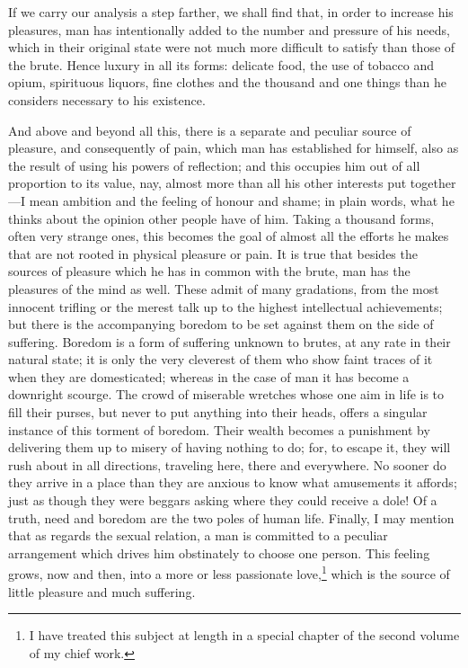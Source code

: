 If we carry our analysis a step farther, we shall find that, in order
to increase his pleasures, man has intentionally added to the number
and pressure of his needs, which in their original state were not much
more difficult to satisfy than those of the brute. Hence luxury in all
its forms: delicate food, the use of tobacco and opium, spirituous
liquors, fine clothes and the thousand and one things than he
considers necessary to his existence.

And above and beyond all this, there is a separate and peculiar source
of pleasure, and consequently of pain, which man has established for
himself, also as the result of using his powers of reflection; and
this occupies him out of all proportion to its value, nay, almost more
than all his other interests put together---I mean ambition and the
feeling of honour and shame; in plain words, what he thinks about the
opinion other people have of him. Taking a thousand forms, often very
strange ones, this becomes the goal of almost all the efforts he makes
that are not rooted in physical pleasure or pain. It is true that
besides the sources of pleasure which he has in common with the brute,
man has the pleasures of the mind as well. These  admit of
many gradations, from the most innocent trifling or the merest talk up
to the highest intellectual achievements; but there is the
accompanying boredom to be set against them on the side of suffering.
Boredom is a form of suffering unknown to brutes, at any rate in their
natural state; it is only the very cleverest of them who show faint
traces of it when they are domesticated; whereas in the case of man it
has become a downright scourge. The crowd of miserable wretches whose
one aim in life is to fill their purses, but never to put anything
into their heads, offers a singular instance of this torment of
boredom. Their wealth becomes a punishment by delivering them up to
misery of having nothing to do; for, to escape it, they will rush
about in all directions, traveling here, there and everywhere. No
sooner do they arrive in a place than they are anxious to know what
amusements it affords; just as though they were beggars asking where
they could receive a dole! Of a truth, need and boredom are the two
poles of human life. Finally, I may mention that as regards the sexual
relation, a man is committed to a peculiar arrangement which drives
him obstinately to choose one person. This feeling grows, now and
then, into a more or less passionate love,\footnote{I have treated
this subject at length in a special chapter of the second volume of my
chief work.} which is the source of little pleasure and much
suffering.

